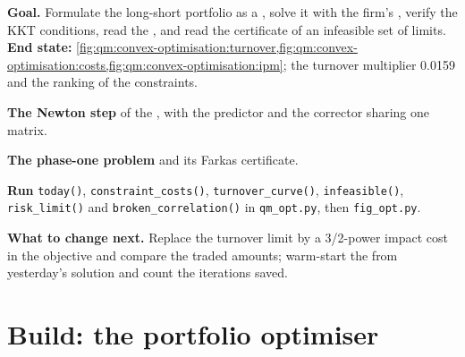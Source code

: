 \begin{tutorial}
\textbf{Goal.} Formulate the long-short portfolio as a , solve it with the firm's , verify the KKT conditions, read the , and read the
certificate of an infeasible set of limits.
\textbf{End state:} \cref{fig:qm:convex-optimisation:turnover,fig:qm:convex-optimisation:costs,fig:qm:convex-optimisation:ipm}; the turnover multiplier 0.0159 and the ranking of the
constraints.
\begin{tutsteps}
\item \textbf{The Newton step} of the , with the predictor and the corrector sharing one matrix.
\label{lst:qm:convex-optimisation:ipm}
\item \textbf{The phase-one problem} and its Farkas certificate.
\label{lst:qm:convex-optimisation:farkas}
\item \textbf{Run} \texttt{today()}, \texttt{constraint\_costs()}, \texttt{turnover\_curve()}, \texttt{infeasible()}, \texttt{risk\_limit()} and \texttt{broken\_correlation()} in
\texttt{qm\_opt.py}, then \texttt{fig\_opt.py}.
\end{tutsteps}
\textbf{What to change next.} Replace the turnover limit by a 3/2-power impact cost in the objective and compare the traded amounts; warm-start the  from yesterday's solution
and count the iterations saved.
\end{tutorial}

\section{Build: the portfolio optimiser}\label{bld:qm:convex-optimisation:portopt}

